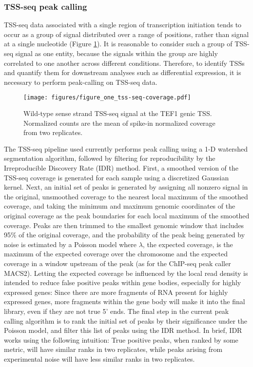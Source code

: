 \documentclass[11pt, a4paper]{article}
\begin{document}
\subsubsection{TSS-seq peak calling}

TSS-seq data associated with a single region of transcription initiation tends to occur as a group of signal distributed over a range of positions, rather than signal at a single nucleotide (Figure \ref{fig:tss_coverage}). It is reasonable to consider such a group of TSS-seq signal as one entity, because the signals within the group are highly correlated to one another across different conditions. Therefore, to identify TSSs and quantify them for downstream analyses such as differential expression, it is necessary to perform peak-calling on TSS-seq data.

\begin{figure}[h]
\centering
\texttt{[image: figures/figure\_one\_tss-seq-coverage.pdf]}
\caption{Wild-type sense strand TSS-seq signal at the TEF1 genic TSS. Normalized counts are the mean of spike-in normalized coverage from two replicates.}
\label{fig:tss_coverage}
\end{figure}

The TSS-seq pipeline used currently performs peak calling using a 1-D watershed segmentation algorithm, followed by filtering for reproducibility by the Irreproducible Discovery Rate (IDR) method. First, a smoothed version of the TSS-seq coverage is generated for each sample using a discretized Gaussian kernel. Next, an initial set of peaks is generated by assigning all nonzero signal in the original, unsmoothed coverage to the nearest local maximum of the smoothed coverage, and taking the minimum and maximum genomic coordinates of the original coverage as the peak boundaries for each local maximum of the smoothed coverage. Peaks are then trimmed to the smallest genomic window that includes 95\% of the original coverage, and the probability of the peak being generated by noise is estimated by a Poisson model where $\lambda$, the expected coverage, is the maximum of the expected coverage over the chromosome and the expected coverage in a window upstream of the peak (as for the ChIP-seq peak caller MACS2). Letting the expected coverage be influenced by the local read density is intended to reduce false positive peaks within gene bodies, especially for highly expressed genes: Since there are more fragments of RNA present for highly expressed genes, more fragments within the gene body will make it into the final library, even if they are not true 5' ends. The final step in the current peak calling algorithm is to rank the initial set of peaks by their significance under the Poisson model, and filter this list of peaks using the IDR method. In brief, IDR works using the following intuition: True positive peaks, when ranked by some metric, will have similar ranks in two replicates, while peaks arising from experimental noise will have less similar ranks in two replicates.
\end{document}
